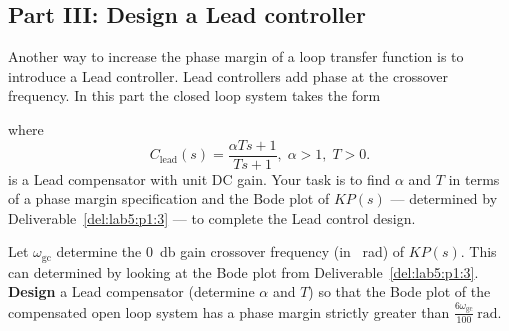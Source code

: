 \subsection{Part III: Design a Lead controller}
Another way to increase the phase margin of a loop transfer function is to introduce a Lead controller.
Lead controllers add phase at the crossover frequency.
In this part the closed loop system takes the form
%
\begin{center}
\end{center}
%
where
\[
  C_\mathrm{lead}(s)
    =
      \frac{\alpha T s + 1}{T s + 1}
  ,
  \;
  \alpha > 1
  ,
  \;
  T > 0.
\]
is a Lead compensator with unit DC gain.
Your task is to find \(\alpha\) and \(T\) in terms of a phase margin specification and the Bode plot of \(K P(s)\) --- determined by Deliverable~\ref{del:lab5:p1:3} --- to complete the Lead control design.
%
\begin{deliverable}[label={del:lab5:p3:1}]
  Let \(\omega_\mathrm{gc}\) determine the \SI{0}{\decibel} gain crossover frequency (in \SI{}{\radian}) of \(K P(s).\) 
  This can determined by looking at the Bode plot from Deliverable~\ref{del:lab5:p1:3}.
  \textbf{Design} a Lead compensator (determine \(\alpha\) and \(T\)) so that the Bode plot of the compensated open loop system has a phase margin strictly greater than \(\frac{6\omega_\mathrm{gc}}{100}~\mathrm{rad}.\)
\end{deliverable}

